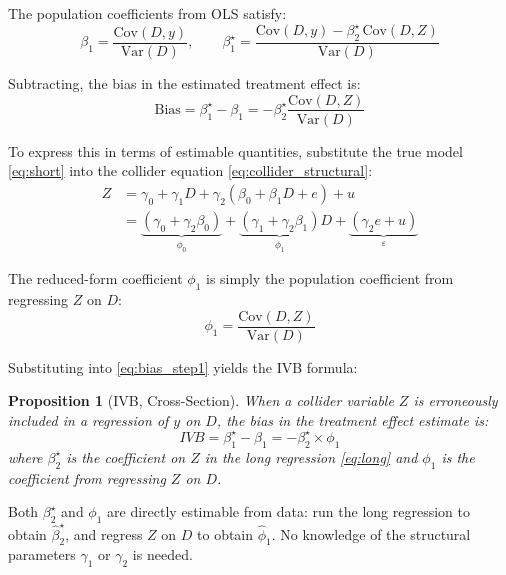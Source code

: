 \documentclass[
]{article}
\newtheorem{proposition}{Proposition}
\begin{document}
The population coefficients from OLS satisfy: \[
\beta_1 = \frac{\text{Cov}(D, y)}{\text{Var}(D)}, \qquad
\beta_1^{\star} = \frac{\text{Cov}(D, y) - \beta_2^{\star} \,\text{Cov}(D, Z)}{\text{Var}(D)}
\]

Subtracting, the bias in the estimated treatment effect is:
\begin{equation}
\text{Bias} = \beta_1^{\star} - \beta_1 = -\beta_2^{\star} \frac{\text{Cov}(D, Z)}{\text{Var}(D)}
\label{eq:bias_step1}
\end{equation}

To express this in terms of estimable quantities, substitute the true
model \eqref{eq:short} into the collider equation
\eqref{eq:collider_structural}: \begin{align}
Z &= \gamma_0 + \gamma_1 D + \gamma_2 (\beta_0 + \beta_1 D + e) + u \nonumber \\
  &= \underbrace{(\gamma_0 + \gamma_2 \beta_0)}_{\phi_0} + \underbrace{(\gamma_1 + \gamma_2 \beta_1)}_{\phi_1} D + \underbrace{(\gamma_2 e + u)}_{\varepsilon}
\label{eq:reduced_form_Z}
\end{align}

The reduced-form coefficient \(\phi_1\) is simply the population
coefficient from regressing \(Z\) on \(D\): \[
\phi_1 = \frac{\text{Cov}(D, Z)}{\text{Var}(D)}
\]

Substituting into \eqref{eq:bias_step1} yields the IVB formula:

\begin{proposition}[IVB, Cross-Section]
\label{prop:ivb_cs}
When a collider variable $Z$ is erroneously included in a regression of $y$ on $D$, the bias in the treatment effect estimate is:
\begin{equation}
\boxed{\textit{IVB} = \beta_1^{\star} - \beta_1 = -\beta_2^{\star} \times \phi_1}
\label{eq:ivb_cs}
\end{equation}
where $\beta_2^{\star}$ is the coefficient on $Z$ in the long regression \eqref{eq:long} and $\phi_1$ is the coefficient from regressing $Z$ on $D$.
\end{proposition}

Both \(\beta_2^{\star}\) and \(\phi_1\) are directly estimable from
data: run the long regression to obtain \(\hat{\beta}_2^{\star}\), and
regress \(Z\) on \(D\) to obtain \(\hat{\phi}_1\). No knowledge of the
structural parameters \(\gamma_1\) or \(\gamma_2\) is needed.
\end{document}
